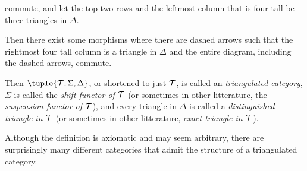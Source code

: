 \begin{definition}
\begin{enumerate}[label={(\bfseries T\arabic*)}]
{\begin{center}
            \end{center}
            commute, and let the top two rows and the leftmost column that is four tall be three triangles in \( \Delta \).

            Then there exist some morphisms where there are dashed arrows such that the rightmost four tall column is a triangle in \( \Delta \) and the entire diagram, including the dashed arrows, commute.
        }
    \end{enumerate}

    Then \( \tuple{ \Tc, \Sigma, \Delta } \), or shortened to just \( {\mathcal{T}} \), is called an \emph{triangulated category}, \( \Sigma \) is called the \emph{shift functor of \( {\mathcal{T}} \)} (or sometimes in other litterature, the \emph{suspension functor of \( {\mathcal{T}} \)}), and every triangle in \( \Delta \) is called a \emph{distinguished triangle in \( {\mathcal{T}} \)} (or sometimes in other litterature, \emph{exact triangle in \( {\mathcal{T}} \)}).
\end{definition}

Although the definition is axiomatic and may seem arbitrary, there are surprisingly many different categories that admit the structure of a triangulated category.
